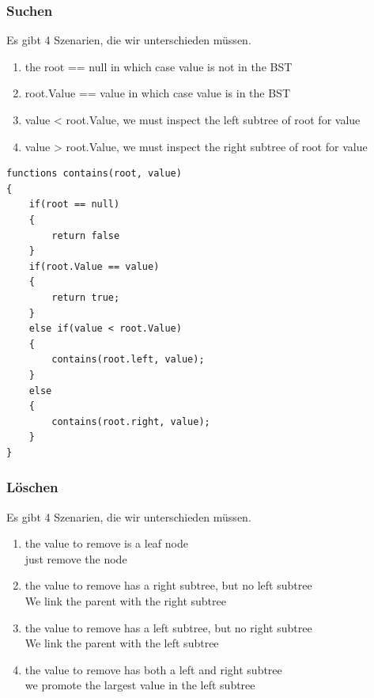 \documentclass[a4paper,10pt]{report}
\begin{document}
\subsubsection{Suchen}
Es gibt 4 Szenarien, die wir unterschieden müssen.
\begin{enumerate}
	\item the root == null in which case value is not in the BST
	\item root.Value == value in which case value is in the BST
	\item value < root.Value, we must inspect the left subtree of root for value
	\item value > root.Value, we must inspect the right subtree of root for value
\end{enumerate}
\begin{lstlisting}
functions contains(root, value)
{
	if(root == null)
	{
		return false
	}
	if(root.Value == value)
	{
		return true;
	}
	else if(value < root.Value)
	{
		contains(root.left, value);
	}
	else
	{
		contains(root.right, value);
	}
}
\end{lstlisting}
\newpage
\subsubsection{Löschen}
Es gibt 4 Szenarien, die wir unterschieden müssen.\\
\begin{enumerate}
	\item the value to remove is a leaf node\\
	just remove the node
	\item the value to remove has a right subtree, but no left subtree\\
	We link the parent with the right subtree
	\item the value to remove has a left subtree, but no right subtree\\
	We link the parent with the left subtree
	\item the value to remove has both a left and right subtree\\
	we promote the largest value in the left subtree
\end{enumerate}
\newpage
\end{document}
